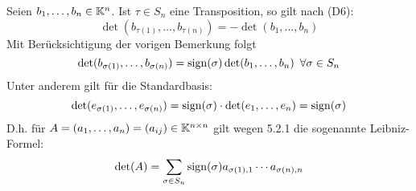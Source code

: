 Seien $ b_1, \ldots, b_n \in \mathbb K^n $. Ist $ \tau \in S_n $ eine Transposition, so gilt nach (D6):
\begin{equation*}
	\det(b_{\tau(1)}, \ldots, b_{\tau(n)}) = -\det(b_1, \ldots, b_n)
\end{equation*}
Mit Berücksichtigung der vorigen Bemerkung folgt
\begin{equation}
	\det(b_{\sigma(1)}, \ldots, b_{\sigma(n)}) = \operatorname{sign}(\sigma) \det(b_1, \ldots, b_n) \enspace\forall \sigma \in S_n
\end{equation}
Unter anderem gilt für die Standardbasis:
\begin{equation*}
	\det(e_{\sigma(1)}, \ldots, e_{\sigma(n)}) = \operatorname{sign}(\sigma) \cdot \det(e_1, \ldots, e_n) = \operatorname{sign}(\sigma)
\end{equation*}
D.h. für $ A = (a_1, \ldots, a_n) = (a_{ij}) \in \mathbb K^{n \times n} $ gilt wegen 5.2.1 die sogenannte Leibniz-Formel:
\begin{equation}
	\det(A) = \sum_{\sigma \in S_n} \operatorname{sign}(\sigma) a_{\sigma(1),1} \cdots a_{\sigma(n),n}
	\label{eq:Leibniz-Formel}
\end{equation}

